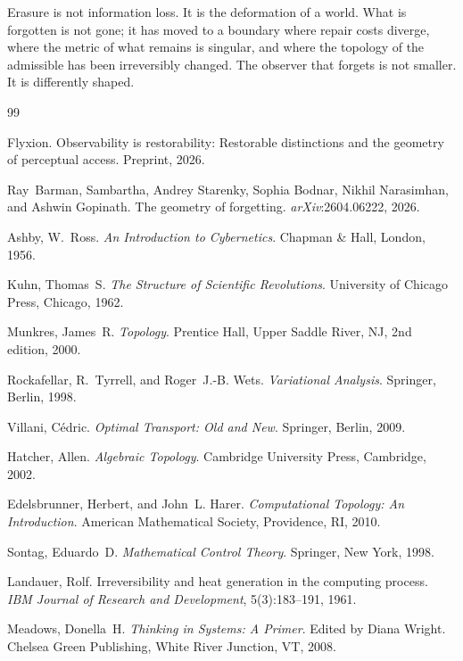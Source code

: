 \documentclass[12pt, oneside]{article}
\theoremstyle{plain}
\theoremstyle{definition}
\theoremstyle{remark}
\begin{document}
\medskip
Erasure is not information loss.
It is the deformation of a world.
What is forgotten is not gone; it has moved to a boundary where
repair costs diverge, where the metric of what remains is singular,
and where the topology of the admissible has been irreversibly
changed.
The observer that forgets is not smaller.
It is differently shaped.

\begin{thebibliography}{99}

Flyxion.
\newblock Observability is restorability: Restorable distinctions and the
  geometry of perceptual access.
\newblock Preprint, 2026.

Ray~Barman, Sambartha, Andrey Starenky, Sophia Bodnar, Nikhil Narasimhan,
  and Ashwin Gopinath.
\newblock The geometry of forgetting.
\newblock \emph{arXiv}:2604.06222, 2026.

Ashby, W.~Ross.
\newblock \emph{An Introduction to Cybernetics}.
\newblock Chapman \& Hall, London, 1956.

Kuhn, Thomas~S.
\newblock \emph{The Structure of Scientific Revolutions}.
\newblock University of Chicago Press, Chicago, 1962.

Munkres, James~R.
\newblock \emph{Topology}.
\newblock Prentice Hall, Upper Saddle River, NJ, 2nd edition, 2000.

Rockafellar, R.~Tyrrell, and Roger~J.-B. Wets.
\newblock \emph{Variational Analysis}.
\newblock Springer, Berlin, 1998.

Villani, C\'edric.
\newblock \emph{Optimal Transport: Old and New}.
\newblock Springer, Berlin, 2009.

Hatcher, Allen.
\newblock \emph{Algebraic Topology}.
\newblock Cambridge University Press, Cambridge, 2002.

Edelsbrunner, Herbert, and John~L. Harer.
\newblock \emph{Computational Topology: An Introduction}.
\newblock American Mathematical Society, Providence, RI, 2010.

Sontag, Eduardo~D.
\newblock \emph{Mathematical Control Theory}.
\newblock Springer, New York, 1998.

Landauer, Rolf.
\newblock Irreversibility and heat generation in the computing process.
\newblock \emph{IBM Journal of Research and Development}, 5(3):183--191, 1961.

Meadows, Donella~H.
\newblock \emph{Thinking in Systems: A Primer}.
\newblock Edited by Diana Wright.
\newblock Chelsea Green Publishing, White River Junction, VT, 2008.

\end{thebibliography}
\end{document}
